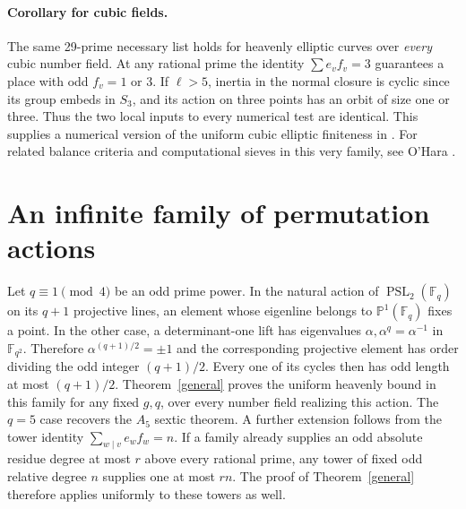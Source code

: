 \documentclass[11pt]{article}
\newcommand{\F}{\mathbb F}
\newcommand{\PSL}{\operatorname{PSL}}
\begin{document}
\paragraph{Corollary for cubic fields.}
The same 29-prime necessary list holds for heavenly elliptic curves
over \emph{every} cubic number field. At any rational prime the
identity $\sum e_vf_v=3$ guarantees a place with odd $f_v=1$ or $3$.
If $\ell>5$, inertia in the normal closure is cyclic since its group
embeds in $S_3$, and its action on three points has an orbit of size
one or three. Thus the two local inputs to every numerical test
are identical. This supplies a numerical version of the uniform
cubic elliptic finiteness in \cite[Prop.~7.5]{rt}. For related
balance criteria and computational sieves in this very family,
see O'Hara \cite{ohara}.

\section{An infinite family of permutation actions}

Let $q\equiv1\pmod4$ be an odd prime power. In the natural action
of $\PSL_2(\F_q)$ on its $q+1$ projective lines, an element whose
eigenline belongs to $\mathbb P^1(\F_q)$ fixes a point.
In the other case, a determinant-one lift has eigenvalues
$\alpha,\alpha^q=\alpha^{-1}$ in $\F_{q^2}$. Therefore
$\alpha^{(q+1)/2}=\pm1$ and the corresponding projective element
has order dividing the odd integer $(q+1)/2$. Every one of its
cycles then has odd length at most $(q+1)/2$.
Theorem~\ref{general} proves the uniform heavenly bound in this
family for any fixed $g,q$, over every number field realizing this
action. The $q=5$ case recovers the $A_5$ sextic theorem. A further
extension follows from the tower identity $\sum_{w\mid v} e_wf_w=n$.
If a family already supplies an odd absolute residue degree at most
$r$ above every rational prime, any tower of fixed odd relative degree
$n$ supplies one at most $rn$. The proof of Theorem~\ref{general}
therefore applies uniformly to these towers as well.
\end{document}

